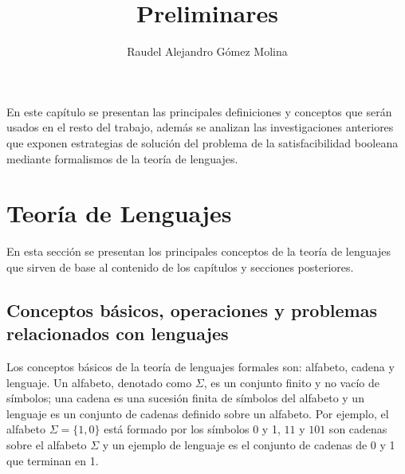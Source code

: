 \documentclass[12pt]{article}
\title{Preliminares}
\author{Raudel Alejandro Gómez Molina}
\begin{document}
\maketitle





En este capítulo se presentan las principales definiciones y conceptos que serán usados en el resto del trabajo, además
se analizan las investigaciones anteriores que exponen estrategias de solución del problema de la satisfacibilidad
booleana  mediante formalismos de la teoría de lenguajes.

\section{Teoría de Lenguajes}

En esta sección se presentan los principales conceptos de la teoría de lenguajes que sirven de base al contenido de los capítulos y secciones posteriores.

\subsection{Conceptos básicos, operaciones y problemas relacionados con lenguajes}

Los conceptos básicos de la teoría de lenguajes formales son: alfabeto, cadena y lenguaje. Un alfabeto, denotado 
como $\Sigma$, es un conjunto finito y no vacío de símbolos; una cadena es una sucesión finita de símbolos del alfabeto y 
un lenguaje es un conjunto de cadenas definido sobre un alfabeto. Por ejemplo, el 
alfabeto $\Sigma=\{1,0\}$ está formado por los símbolos 0 y 1, $11$ y $101$ son cadenas sobre el alfabeto $\Sigma$ y un ejemplo de lenguaje
es  el conjunto de cadenas de 0 y 1 que terminan en 1.
\end{document}
